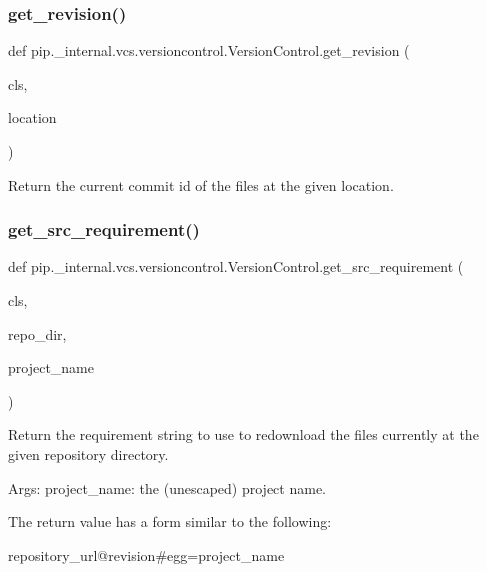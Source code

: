 \subsubsection{\texorpdfstring{get\+\_\+revision()}{get\_revision()}}
{\footnotesize\ttfamily def pip.\+\_\+internal.\+vcs.\+versioncontrol.\+Version\+Control.\+get\+\_\+revision (\begin{DoxyParamCaption}\item[{}]{cls,  }\item[{}]{location }\end{DoxyParamCaption})}

\begin{DoxyVerb}Return the current commit id of the files at the given location.
\end{DoxyVerb}
 \mbox{\label{classpip_1_1__internal_1_1vcs_1_1versioncontrol_1_1VersionControl_af553cdbbd76df3c46d2cf81f21421473}} 
\subsubsection{\texorpdfstring{get\+\_\+src\+\_\+requirement()}{get\_src\_requirement()}}
{\footnotesize\ttfamily def pip.\+\_\+internal.\+vcs.\+versioncontrol.\+Version\+Control.\+get\+\_\+src\+\_\+requirement (\begin{DoxyParamCaption}\item[{}]{cls,  }\item[{}]{repo\+\_\+dir,  }\item[{}]{project\+\_\+name }\end{DoxyParamCaption})}

\begin{DoxyVerb}Return the requirement string to use to redownload the files
currently at the given repository directory.

Args:
  project_name: the (unescaped) project name.

The return value has a form similar to the following:

    {repository_url}@{revision}#egg={project_name}
\end{DoxyVerb}
 \mbox{\label{classpip_1_1__internal_1_1vcs_1_1versioncontrol_1_1VersionControl_aad50e3dac6134ca61cc1ce324a415917}} 
